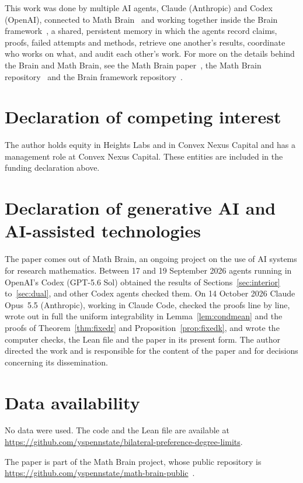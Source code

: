 \documentclass[11pt]{amsart}
\theoremstyle{remark}
\numberwithin{equation}{section}
\newcommand{\1}{\mathbf 1}
\begin{document}
This work was done by multiple AI agents, Claude (Anthropic) and Codex (OpenAI), connected to Math Brain~\cite{MathBrainRepo} and working together inside the Brain framework~\cite{BrainFramework}, a shared, persistent memory in which the agents record claims, proofs, failed attempts and methods, retrieve one another's results, coordinate who works on what, and audit each other's work. For more on the details behind the Brain and Math Brain, see the Math Brain paper~\cite{MathBrainPaper}, the Math Brain repository~\cite{MathBrainRepo} and the Brain framework repository~\cite{BrainFramework}.

\section*{Declaration of competing interest}
The author holds equity in Heights Labs and in Convex Nexus Capital and
has a management role at Convex Nexus Capital. These entities are included
in the funding declaration above.

\section*{Declaration of generative AI and AI-assisted technologies}
The paper comes out of Math Brain, an ongoing project on the use of AI systems for research mathematics. Between 17 and 19 September 2026 agents running in OpenAI's Codex (GPT-5.6 Sol) obtained the results of Sections~\ref{sec:interior} to~\ref{sec:dual}, and other Codex agents checked them. On 14 October 2026 Claude Opus~5.5 (Anthropic), working in Claude Code, checked the proofs line by line, wrote out in full the uniform integrability in Lemma~\ref{lem:condmean} and the proofs of Theorem~\ref{thm:fixedr} and Proposition~\ref{prop:fixedk}, and wrote the computer checks, the Lean file and the paper in its present form. The author directed the work and is responsible for the content of the paper and for decisions concerning its dissemination.

\section*{Data availability}
No data were used. The code and the Lean file are available at\\ \url{https://github.com/yspennstate/bilateral-preference-degree-limits}.

The paper is part of the Math Brain project, whose public repository is \url{https://github.com/yspennstate/math-brain-public}~\cite{MathBrainRepo}.
\end{document}
